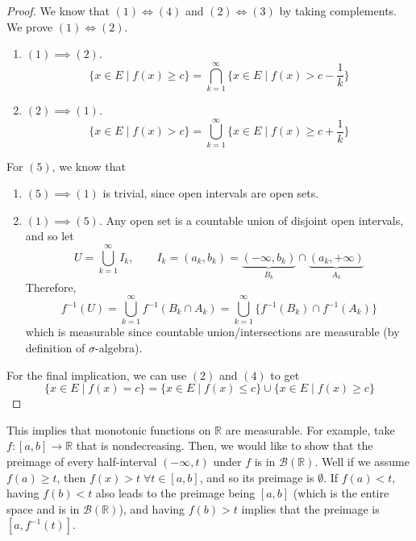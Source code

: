   \begin{proof}
    We know that $(1) \iff (4)$ and $(2) \iff (3)$ by taking complements. We prove $(1) \iff (2)$. 
    \begin{enumerate}
      \item $(1) \implies (2)$. 
      \begin{equation}
        \{x \in E \mid f(x) \geq c \} = \bigcap_{k=1}^\infty \{x \in E \mid f(x) > c - \frac{1}{k} \}
      \end{equation}

      \item $(2) \implies (1)$. 
      \begin{equation}
        \{ x \in E \mid f(x) > c\} = \bigcup_{k=1}^\infty \{x \in E \mid f(x) \geq c + \frac{1}{k} \}
      \end{equation}
    \end{enumerate}

    For $(5)$, we know that
    \begin{enumerate}
      \item $(5) \implies (1)$ is trivial, since open intervals are open sets. 
      \item $(1) \implies (5)$. Any open set is a countable union of disjoint open intervals, and so let 
      \begin{equation}
        U = \bigcup_{k=1}^\infty I_k, \qquad I_k = (a_k, b_k) = \underbrace{(-\infty, b_k)}_{B_k} \cap \underbrace{(a_k, +\infty)}_{A_k}
      \end{equation} 
      Therefore, 
      \begin{equation}
        f^{-1} (U) = \bigcup_{k=1}^\infty f^{-1} (B_k \cap A_k) = \bigcup_{k=1}^\infty \{f^{-1} (B_k) \cap f^{-1} (A_k) \}
      \end{equation}
      which is measurable since countable union/intersections are measurable (by definition of $\sigma$-algebra). 
    \end{enumerate}

    For the final implication, we can use $(2)$ and $(4)$ to get 
    \begin{equation}
      \{x \in E \mid f(x) = c\} = \{x \in E \mid f(x) \leq c \} \cup \{x \in E \mid f(x) \geq c \}
    \end{equation}
  \end{proof} 

  This implies that monotonic functions on $\mathbb{R}$ are measurable. For example, take $f: [a, b] \longrightarrow \mathbb{R}$ that is nondecreasing. Then, we would like to show that the preimage of every half-interval $(-\infty, t)$ under $f$ is in $\mathcal{B}(\mathbb{R})$. Well if we assume $f(a) \geq t$, then $f(x) > t \; \forall t \in [a, b]$, and so its preimage is $\emptyset$. If $f(a) < t$, having $f(b) < t$ also leads to the preimage being $[a, b]$ (which is the entire space and is in $\mathcal{B}(\mathbb{R})$), and having $f(b) > t$ implies that the preimage is $[a, f^{-1}(t)]$. 

